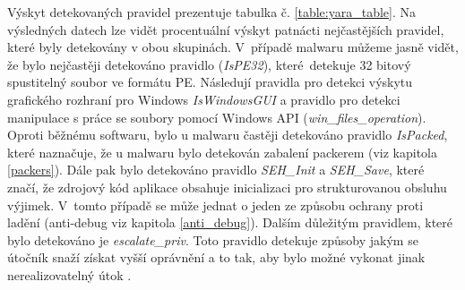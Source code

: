 Výskyt detekovaných pravidel prezentuje tabulka č. \ref{table:yara_table}. Na výsledných datech lze vidět procentuální výskyt patnácti nejčastějších pravidel, které byly detekovány v obou skupinách. V~případě malwaru můžeme jasně vidět, že bylo nejčastěji detekováno pravidlo (\emph{IsPE32}), které~detekuje 32 bitový spustitelný soubor ve formátu PE. Následují pravidla pro detekci výskytu grafického rozhraní pro Windows \emph{IsWindowsGUI} a pravidlo pro detekci manipulace s práce se soubory pomocí Windows API (\emph{win\_files\_operation}). Oproti běžnému softwaru, bylo u malwaru častěji detekováno pravidlo \emph{IsPacked}, které naznačuje, že u malwaru bylo detekován zabalení packerem (viz kapitola \ref{packers}). Dále pak bylo detekováno pravidlo \emph{SEH\_Init} a \emph{SEH\_Save}, které značí, že zdrojový kód aplikace obsahuje inicializaci pro strukturovanou obsluhu výjimek. V~tomto případě se může jednat o jeden ze způsobu ochrany proti ladění (anti-debug viz kapitola \ref{anti_debug}). Dalším důležitým pravidlem, které bylo detekováno je \emph{escalate\_priv}. Toto pravidlo detekuje způsoby jakým se útočník snaží získat vyšší oprávnění a to tak, aby bylo možné vykonat jinak nerealizovatelný útok \cite{privilage_escl}.

